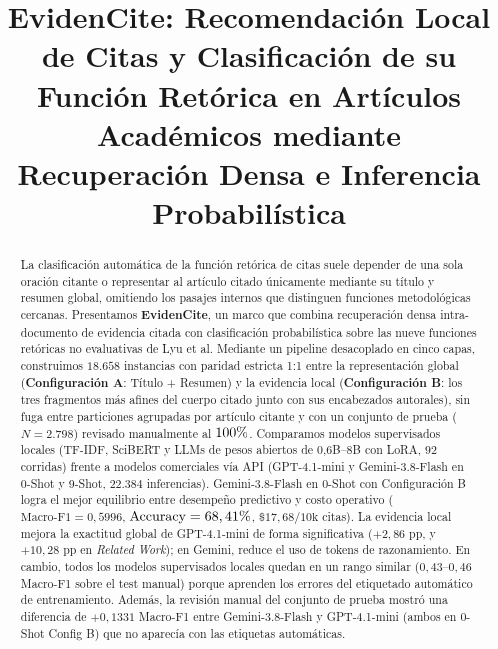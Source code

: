 \documentclass[conference]{IEEEtran}
\newcommand{\pct}{\mbox{\symbol{37}}}
\begin{document}
\title{EvidenCite: Recomendación Local de Citas y Clasificación de su Función Retórica en Artículos Académicos mediante Recuperación Densa e Inferencia Probabilística}

\author{
}

\maketitle

\begin{abstract}
La clasificación automática de la función retórica de citas suele depender de una sola oración citante o representar al artículo citado únicamente mediante su título y resumen global, omitiendo los pasajes internos que distinguen funciones metodológicas cercanas. Presentamos \textbf{EvidenCite}, un marco que combina recuperación densa intra-documento de evidencia citada con clasificación probabilística sobre las nueve funciones retóricas no evaluativas de Lyu et al. Mediante un pipeline desacoplado en cinco capas, construimos $18.658$ instancias con paridad estricta 1:1 entre la representación global (\textbf{Configuración A}: Título + Resumen) y la evidencia local (\textbf{Configuración B}: los tres fragmentos más afines del cuerpo citado junto con sus encabezados autorales), sin fuga entre particiones agrupadas por artículo citante y con un conjunto de prueba ($N=2.798$) revisado manualmente al $100\pct{}$. Comparamos modelos supervisados locales (TF-IDF, SciBERT y LLMs de pesos abiertos de 0,6B--8B con LoRA, $92$ corridas) frente a modelos comerciales vía API (GPT-4.1-mini y Gemini-3.8-Flash en 0-Shot y 9-Shot, $22.384$ inferencias). Gemini-3.8-Flash en 0-Shot con Configuración B logra el mejor equilibrio entre desempeño predictivo y costo operativo ($\text{Macro-F1}=0,5996$, $\text{Accuracy}=68,41\pct{}$, $\$17,68/10\text{k}$ citas). La evidencia local mejora la exactitud global de GPT-4.1-mini de forma significativa ($+2,86\text{ pp}$, y $+10,28\text{ pp}$ en \textit{Related Work}); en Gemini, reduce el uso de tokens de razonamiento. En cambio, todos los modelos supervisados locales quedan en un rango similar ($0,43\text{--}0,46$ Macro-F1 sobre el test manual) porque aprenden los errores del etiquetado automático de entrenamiento. Además, la revisión manual del conjunto de prueba mostró una diferencia de $+0,1331$ Macro-F1 entre Gemini-3.8-Flash y GPT-4.1-mini (ambos en 0-Shot Config B) que no aparecía con las etiquetas automáticas.
\end{abstract}
\end{document}
